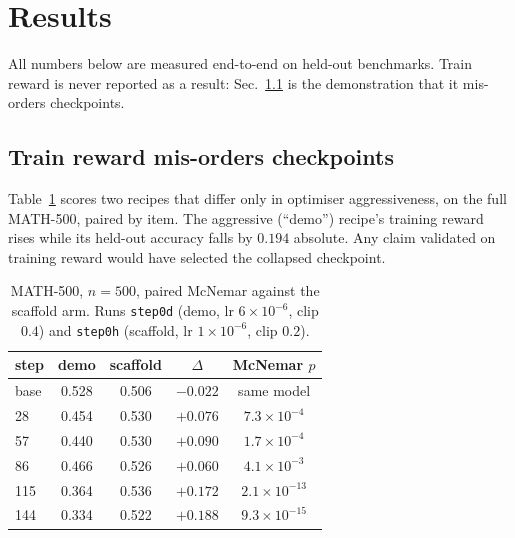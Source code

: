 \section{Results}
\label{sec:results}

All numbers below are measured end-to-end on held-out benchmarks. Train reward is never
reported as a result: Sec.~\ref{sec:trainreward} is the demonstration that it mis-orders
checkpoints.

\subsection{Train reward mis-orders checkpoints}
\label{sec:trainreward}

Table~\ref{tab:ab} scores two recipes that differ only in optimiser aggressiveness, on the
full MATH-500, paired by item. The aggressive (``demo'') recipe's training reward rises
while its held-out accuracy falls by $0.194$ absolute. Any claim validated on training
reward would have selected the collapsed checkpoint.

\begin{table}[t]
\centering\small
\caption{MATH-500, $n=500$, paired McNemar against the scaffold arm. Runs
\texttt{step0d} (demo, lr $6\!\times\!10^{-6}$, clip $0.4$) and \texttt{step0h}
(scaffold, lr $1\!\times\!10^{-6}$, clip $0.2$).}
\label{tab:ab}
\begin{tabular}{lccc c}
\toprule
step & demo & scaffold & $\Delta$ & McNemar $p$ \\
\midrule
base & 0.528 & 0.506 & $-0.022$ & same model \\
28   & 0.454 & 0.530 & $+0.076$ & $7.3\times10^{-4}$ \\
57   & 0.440 & 0.530 & $+0.090$ & $1.7\times10^{-4}$ \\
86   & 0.466 & 0.526 & $+0.060$ & $4.1\times10^{-3}$ \\
115  & 0.364 & 0.536 & $+0.172$ & $2.1\times10^{-13}$ \\
144  & 0.334 & 0.522 & $+0.188$ & $9.3\times10^{-15}$ \\
\bottomrule
\end{tabular}
\end{table}

